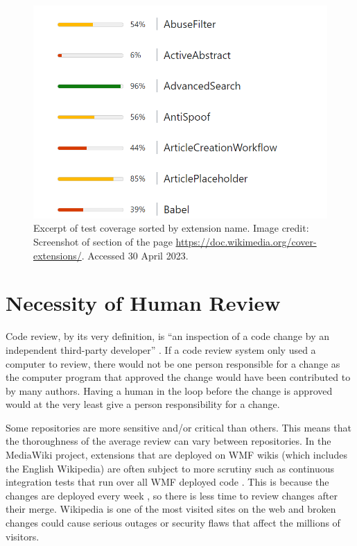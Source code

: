 \begin{figure}[htb]
    \centering
    \includegraphics[scale=0.6]{images/MediaWiki-extensions-test-coverage-list.png}
    \caption[Excerpt of test coverage sorted by extension name.]{Excerpt of test coverage sorted by extension name. Image credit: Screenshot of section of the page \url{https://doc.wikimedia.org/cover-extensions/}. Accessed 30 April 2023.}
    \label{fig:extension-test-coverage-example}
\end{figure}

\section{Necessity of Human Review}

Code review, by its very definition, is ``an inspection of a code change by an independent third-party developer'' \citep[p. 141]{7081824}. If a code review system only used a computer to review, there would not be one person responsible for a change as the computer program that approved the change would have been contributed to by many authors. Having a human in the loop before the change is approved would at the very least give a person responsibility for a change.

Some repositories are more sensitive and/or critical than others. This means that the thoroughness of the average review can vary between repositories. In the MediaWiki project, extensions that are deployed on WMF wikis (which includes the English Wikipedia) \citep{wikitech:Deployments/Train} are often subject to more scrutiny such as continuous integration tests that run over all WMF deployed code \citep{github:integration-config-extension-gate}. This is because the changes are deployed every week \citep{wikitech:Deployments/Train}, so there is less time to review changes after their merge. Wikipedia is one of the most visited sites on the web \citep[p. 2365]{10.1145/3366423.3380300} \citep[p. 249]{10.1145/3442381.3450136} and broken changes could cause serious outages or security flaws that affect the millions of visitors.

